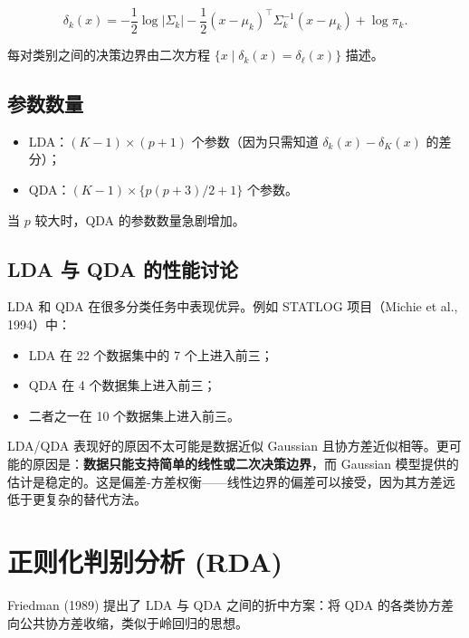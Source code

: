 \begin{equation}\label{eq:qda_discriminant}
    \delta_k(x) = -\frac{1}{2}\log|\Sigma_k|
    - \frac{1}{2}(x - \mu_k)^\top \Sigma_k^{-1}(x - \mu_k)
    + \log \pi_k.
\end{equation}

每对类别之间的决策边界由二次方程 $\{x \mid \delta_k(x) = \delta_\ell(x)\}$ 描述。

\subsection{参数数量}

\begin{itemize}
    \item LDA：$(K-1) \times (p+1)$ 个参数（因为只需知道 $\delta_k(x) - \delta_K(x)$ 的差分）；
    \item QDA：$(K-1) \times \{p(p+3)/2 + 1\}$ 个参数。
\end{itemize}

当 $p$ 较大时，QDA 的参数数量急剧增加。

\subsection{LDA 与 QDA 的性能讨论}

LDA 和 QDA 在很多分类任务中表现优异。例如 STATLOG 项目（Michie et al., 1994）中：
\begin{itemize}
    \item LDA 在 22 个数据集中的 7 个上进入前三；
    \item QDA 在 4 个数据集上进入前三；
    \item 二者之一在 10 个数据集上进入前三。
\end{itemize}

\begin{remark}
LDA/QDA 表现好的原因不太可能是数据近似 Gaussian 且协方差近似相等。更可能的原因是：\textbf{数据只能支持简单的线性或二次决策边界}，而 Gaussian 模型提供的估计是稳定的。这是偏差-方差权衡——线性边界的偏差可以接受，因为其方差远低于更复杂的替代方法。
\end{remark}


\section{正则化判别分析 (RDA)}

Friedman (1989) 提出了 LDA 与 QDA 之间的折中方案：将 QDA 的各类协方差向公共协方差收缩，类似于岭回归的思想。

